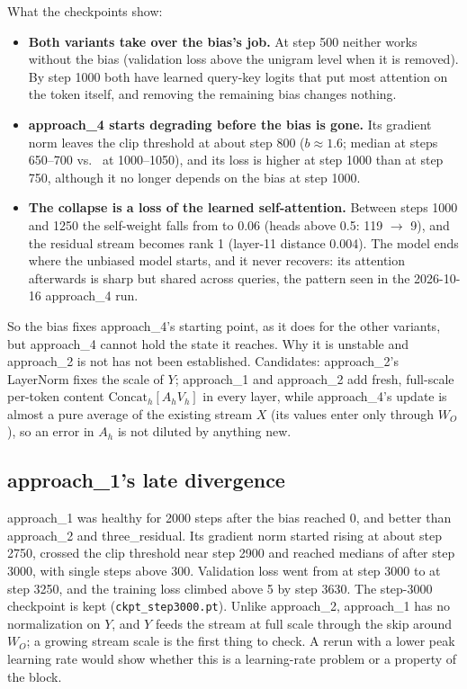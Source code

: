 \documentclass[11pt]{article}
\newcommand{\code}[1]{\texttt{#1}}
\newcommand{\cat}{\mathrm{Concat}_h}
\newcommand{\aone}{approach\_1}
\newcommand{\atwo}{approach\_2}
\newcommand{\afour}{approach\_4}
\newcommand{\tr}{three\_residual}
\begin{document}
What the checkpoints show:
\begin{itemize}
\item \textbf{Both variants take over the bias's job.} At step 500 neither works without the bias (validation loss
above the unigram level when it is removed). By step 1000 both have learned query-key logits that put most
attention on the token itself, and removing the remaining bias changes nothing.
\item \textbf{\afour{} starts degrading before the bias is gone.} Its gradient norm leaves the clip threshold at
about step 800 ($b \approx 1.6$; median \GnAFourMid{} at steps 650--700 vs.\ \GnAFourEnd{} at 1000--1050), and
its loss is higher at step 1000 than at step 750, although it no longer depends on the bias at step 1000.
\item \textbf{The collapse is a loss of the learned self-attention.} Between steps 1000 and 1250 the self-weight
falls from \SzAFourOneK{} to 0.06 (heads above 0.5: 119 $\to$ 9), and the residual stream becomes rank 1 (layer-11
distance 0.004). The model ends where the unbiased model starts, and it never recovers: its attention afterwards
is sharp but shared across queries, the pattern seen in the 2026-10-16 \afour{} run.
\end{itemize}
So the bias fixes \afour{}'s starting point, as it does for the other variants, but \afour{} cannot hold the state
it reaches. Why it is unstable and \atwo{} is not has not been established. Candidates: \atwo{}'s LayerNorm fixes
the scale of $Y$; \aone{} and \atwo{} add fresh, full-scale per-token content $\cat[A_hV_h]$ in every layer, while
\afour{}'s update is almost a pure average of the existing stream $X$ (its values enter only through $W_O$), so an
error in $A_h$ is not diluted by anything new.

\subsection{\aone{}'s late divergence}
\aone{} was healthy for 2000 steps after the bias reached 0, and better than \atwo{} and \tr{}. Its gradient
norm started rising at about step 2750, crossed the clip threshold near step 2900 and reached medians of
\GnAOneLate{} after step 3000, with single steps above 300. Validation loss went from \AOneAtThreeK{} at step 3000
to \AOneAtThreeQK{} at step 3250, and the training loss climbed above 5 by step 3630. The step-3000 checkpoint is
kept (\code{ckpt\_step3000.pt}). Unlike \atwo{}, \aone{} has no normalization on $Y$, and $Y$ feeds the stream at full
scale through the skip around $W_O$; a growing stream scale is the first thing to check. A rerun with a lower
peak learning rate would show whether this is a learning-rate problem or a property of the block.
\end{document}
